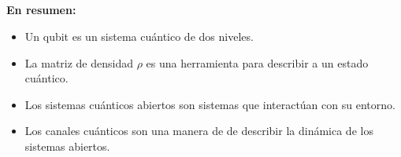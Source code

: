 \documentclass[11pt,xcolor=dvipsnames]{beamer}
\begin{document}
%
%
%

\subsection{}
\begin{frame}%
	\textbf{En resumen:}
	\begin{itemize}[label=$\textcolor{Blue}{\blacktriangleright}$]
		\item Un \alert{qubit} es un sistema cuántico de dos niveles.
		\item La \alert{matriz de densidad $\rho$} es una herramienta para 
		describir	a un estado cuántico.
		\item Los \alert{sistemas cuánticos abiertos} son sistemas que interactúan  
		con su entorno.
		\item Los \alert{canales cuánticos} son una manera de de describir la 
		dinámica de los sistemas abiertos.
	\end{itemize}
\end{frame}
\end{document}
